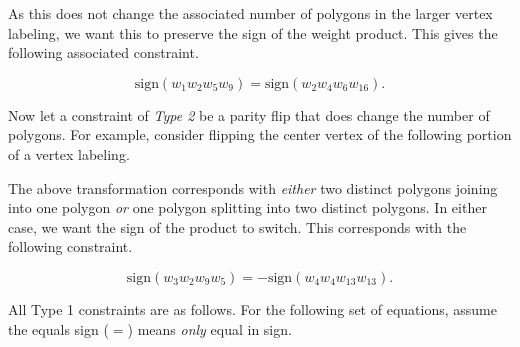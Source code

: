 \documentclass[12pt]{article}
\theoremstyle{plain}
\theoremstyle{definition}
\theoremstyle{remark}
\theoremstyle{definition}
\newcommand{\cell}[4]{ \draw[thick] ( #1 , #2 ) rectangle ( #3 , #4 );}
\newcommand{\lablnode}[3]{\node[shape=circle,draw=none,fill=none, inner sep=0pt,minimum size=5pt] (A) at ( #1 , #2 ) {#3};}
\newcommand{\lablvertex}[3]{\node[shape=circle,draw=none,fill=white, inner sep=2pt,minimum size=5pt] (A) at ( #1 , #2 ) {#3};}
\begin{document}
As this does not change the associated number of polygons in the larger vertex labeling, we want this to preserve the sign of the weight product. This gives the following associated constraint. 

$$\text{sign}(w_{1}w_{2}w_{5}w_{9}) = \text{sign}(w_{2}w_{4}w_{6}w_{16}).$$

Now let a constraint of \textit{Type 2} be a parity flip that does change the number of polygons. For example, consider flipping the center vertex of the following portion of a vertex labeling.

\begin{center}
\end{center}

The above transformation corresponds with \textit{either} two distinct polygons joining into one polygon \textit{or} one polygon splitting into two distinct polygons. In either case, we want the sign of the product to switch. This corresponds with the following constraint.

$$\text{sign}(w_{3}w_{2}w_{9}w_{5}) = -\text{sign}(w_{4}w_{4}w_{13}w_{13}).$$

All Type 1 constraints are as follows. For the following set of equations, assume the equals sign ($=$) means \textit{only} equal in sign.
\end{document}
